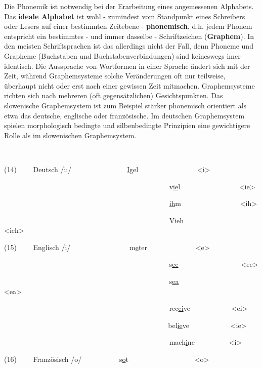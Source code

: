 \documentclass[
  letterpaper,
]{scrbook}
\begin{document}
Die Phonemik ist notwendig bei der Erarbeitung eines angemessenen
Alphabets. Das \textbf{ideale Alphabet} ist wohl - zumindest vom
Standpunkt eines Schreibers oder Lesers auf einer bestimmten Zeitebene -
\textbf{phonemisch}, d.h. jedem Phonem entspricht ein bestimmtes - und
immer dasselbe - Schriftzeichen (\textbf{Graphem}). In den meisten
Schriftsprachen ist das allerdings nicht der Fall, denn Phoneme und
Grapheme (Buchstaben und Buchstabenverbindungen) sind keineswegs imer
identisch. Die Aussprache von Wortformen in einer Sprache ändert sich
mit der Zeit, während Graphemsysteme solche Veränderungen oft nur
teilweise, überhaupt nicht oder erst nach einer gewissen Zeit mitmachen.
Graphemsysteme richten sich nach mehreren (oft gegensätzlichen)
Gesichtspunkten. Das slowenische Graphemsystem ist zum Beispiel stärker
phonemisch orientiert als etwa das deutsche, englische oder
französische. Im deutschen Graphemsystem spielen morphologisch bedingte
und silbenbedingte Prinzipien eine gewichtigere Rolle als im
slowenischen Graphemsystem.

~

(14)~~~~ Deutsch /i:/~~~~~~~~~~~~~~~ \uline{I}gel~~~~~~~~~~~~~~~~
\textless i\textgreater{}

~~~~~~~~~~~~~~~~~~~~~~~~~~~~~~~~~~~~~~~~~~~~~~
v\uline{ie}l~~~~~~~~~~~~~~~~ \textless ie\textgreater{}

~~~~~~~~~~~~~~~~~~~~~~~~~~~~~~~~~~~~~~~~~~~~~~
\uline{ih}m~~~~~~~~~~~~~~~~ \textless ih\textgreater{}

~~~~~~~~~~~~~~~~~~~~~~~~~~~~~~~~~~~~~~~~~~~~~~
V\uline{ieh}~~~~~~~~~~~~~~~ \textless ieh\textgreater{}

(15)~~~~ Englisch /i/~~~~~~~~~~~~~~~~ m\uline{e}ter~~~~~~~~~~~~~
\textless e\textgreater{}

~~~~~~~~~~~~~~~~~~~~~~~~~~~~~~~~~~~~~~~~~~~~~~
s\uline{ee}~~~~~~~~~~~~~~~~~ \textless ee\textgreater{}

~~~~~~~~~~~~~~~~~~~~~~~~~~~~~~~~~~~~~~~~~~~~~~
s\uline{ea}~~~~~~~~~~~~~~~~~ \textless ea\textgreater{}

~~~~~~~~~~~~~~~~~~~~~~~~~~~~~~~~~~~~~~~~~~~~~~
rec\uline{ei}ve~~~~~~~~~~~ \textless ei\textgreater{}

~~~~~~~~~~~ ~~~~~~~~~~~~~~~~~~~~~~~~~~~~~~~~~~
bel\uline{ie}ve~~~~~~~~~~~ \textless ie\textgreater{}

~~~~~~~~~~~~~~~~~~~~~~~~~~~~~~~~~~~~~~~~~~~~~~ mach\uline{i}ne~~~~~~~~~
\textless i\textgreater{}

(16)~~~~ Französisch /o/~~~~~~~~~~ s\uline{o}t~~~~~~~~~~~~~~~~~~
\textless o\textgreater{}
\end{document}
